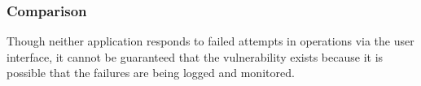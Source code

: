 \subsubsection{Comparison}
Though neither application responds to failed attempts in operations via the user interface, it cannot be guaranteed that the vulnerability exists because it is possible that the failures are being logged and monitored.
\clearpage